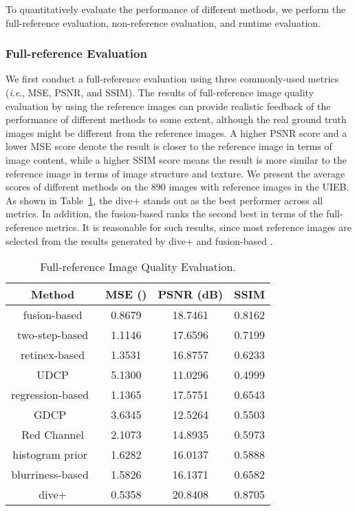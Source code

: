 \documentclass[journal]{IEEEtran}
\newcommand{\ie}{\textit{i}.\textit{e}.}
\begin{document}
To quantitatively evaluate the performance of different methods, we perform the full-reference evaluation, non-reference evaluation, and runtime evaluation.

\subsubsection{Full-reference Evaluation}

We first conduct a full-reference evaluation using three commonly-used metrics (\ie, MSE, PSNR, and SSIM). The results of full-reference image quality evaluation by using the reference images can provide realistic feedback of the performance of different methods to some extent, although the real ground truth images might be different from the reference images.
A higher PSNR score and a lower MSE score denote the result is closer to the reference image in terms of image content, while a higher SSIM score means the result is more similar to the reference image in terms of image structure and texture.
We present the average scores of different methods on the 890 images with reference images in the UIEB. As shown in Table~\ref{table_2}, the dive+ stands out as the best performer across all metrics. In addition, the fusion-based \cite{Ancuti2012} ranks the second best in terms of the full-reference metrics. It is reasonable for such results, since most reference images are selected from the results generated by dive+ and fusion-based \cite{Ancuti2012}.


\begin{table}[htbp]
\caption{Full-reference Image Quality Evaluation.}
 \centering
\begin{tabular}{c|c|c|c}
  \hline
  \textbf{Method} & \textbf{MSE ()}  & \textbf{PSNR (dB)}  & \textbf{SSIM}  \\
  \hline
  fusion-based \cite{Ancuti2012} & {\color{blue}0.8679} & {\color{blue}18.7461} & {\color{blue}0.8162}\\
  two-step-based \cite{Fu2017} & 1.1146 &17.6596 &0.7199 \\
  retinex-based \cite{Fu2014} & {\color{black}1.3531} &  {\color{black} 16.8757} & 0.6233\\
  UDCP  \cite{Drews2016} & 5.1300& 11.0296 &0.4999\\
  regression-based~\cite{Li2017prl} & 1.1365 & 17.5751 &0.6543 \\
  GDCP~\cite{Peng2018} & 3.6345 &12.5264 &0.5503\\
  Red Channel \cite{Galdran2015} &2.1073& 14.8935 &0.5973 \\
  histogram prior~\cite{Li2016} & 1.6282 & 16.0137& 0.5888\\
  blurriness-based~\cite{Peng2017} &1.5826 & 16.1371 & 0.6582\\
 dive+ &  \textcolor[rgb]{1.00,0.00,0.00}{0.5358} & \textcolor[rgb]{1.00,0.00,0.00}{20.8408} & \textcolor[rgb]{1.00,0.00,0.00}{0.8705}\\
  \hline
\end{tabular}
\vspace{\baselineskip}
\label{table_2}
\end{table}
\end{document}
